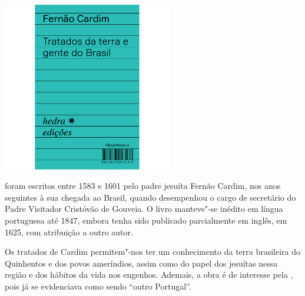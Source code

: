 \pagebreak

\begin{center}
\hspace*{.5cm}\includegraphics[width=74mm]{./grid/cardim.jpg}
\end{center}

\hspace*{-7cm}\hrulefill\hspace*{-7cm}

\medskip

 foram escritos entre 1583 e 1601 pelo padre jesuíta Fernão Cardim, nos anos seguintes à sua chegada ao Brasil, quando desempenhou o cargo de secretário do Padre Visitador Cristóvão de Gouveia. O livro manteve"-se inédito em língua portuguesa até 1847, embora tenha sido publicado parcialmente em inglês, em 1625, com atribuição a outro autor.

Os tratados de Cardim permitem"-nos ter um conhecimento da terra brasileira do Quinhentos e dos povos ameríndios, assim como do papel dos jesuítas nessa região e dos hábitos da vida nos engenhos. Ademais, a obra é de interesse pela , pois já se evidenciava como sendo “outro Portugal”. 

\vfill

\hspace*{-.4cm}\begin{minipage}[c]{.5\linewidth}
\small{
{}}
\end{minipage}

